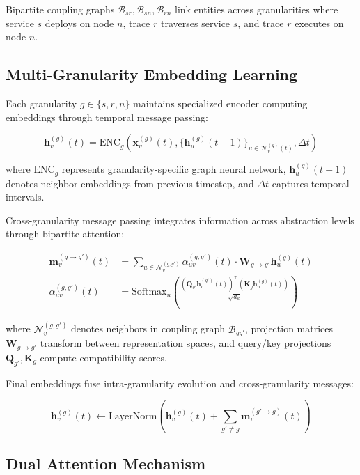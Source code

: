 Bipartite coupling graphs $\mathcal{B}_{sr}, \mathcal{B}_{sn}, \mathcal{B}_{rn}$ link entities across granularities where service $s$ deploys on node $n$, trace $r$ traverses service $s$, and trace $r$ executes on node $n$.

\subsection{Multi-Granularity Embedding Learning}

Each granularity $g \in \{s, r, n\}$ maintains specialized encoder computing embeddings through temporal message passing:

\begin{equation}
\mathbf{h}_v^{(g)}(t) = \text{ENC}_g\left(\mathbf{x}_v^{(g)}(t), \{\mathbf{h}_u^{(g)}(t-1)\}_{u \in \mathcal{N}_v^{(g)}(t)}, \Delta t\right)
\end{equation}

where $\text{ENC}_g$ represents granularity-specific graph neural network, $\mathbf{h}_u^{(g)}(t-1)$ denotes neighbor embeddings from previous timestep, and $\Delta t$ captures temporal intervals.

Cross-granularity message passing integrates information across abstraction levels through bipartite attention:

\begin{align}
\mathbf{m}_v^{(g \to g')}(t) &= \sum_{u \in \mathcal{N}_v^{(g,g')}} \alpha_{uv}^{(g,g')}(t) \cdot \mathbf{W}_{g \to g'} \mathbf{h}_u^{(g)}(t) \\
\alpha_{uv}^{(g,g')}(t) &= \text{Softmax}_u\left(\frac{(\mathbf{Q}_{g'}\mathbf{h}_v^{(g')}(t))^\top (\mathbf{K}_g\mathbf{h}_u^{(g)}(t))}{\sqrt{d_k}}\right)
\end{align}

where $\mathcal{N}_v^{(g,g')}$ denotes neighbors in coupling graph $\mathcal{B}_{gg'}$, projection matrices $\mathbf{W}_{g \to g'}$ transform between representation spaces, and query/key projections $\mathbf{Q}_{g'}, \mathbf{K}_g$ compute compatibility scores.

Final embeddings fuse intra-granularity evolution and cross-granularity messages:

\begin{equation}
\mathbf{h}_v^{(g)}(t) \leftarrow \text{LayerNorm}\left(\mathbf{h}_v^{(g)}(t) + \sum_{g' \neq g} \mathbf{m}_v^{(g' \to g)}(t)\right)
\end{equation}

\subsection{Dual Attention Mechanism}

